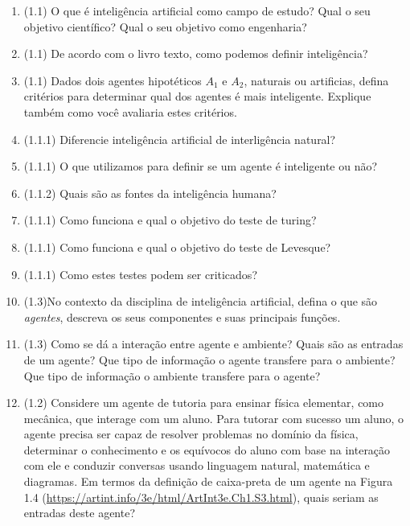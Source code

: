 \documentclass{article}
\begin{document}
\begin{enumerate}
\item (1.1) O que é inteligência artificial como campo de estudo? Qual o seu objetivo científico? Qual o seu objetivo como engenharia?

\item (1.1) De acordo com o livro texto, como podemos definir inteligência?

\item (1.1) Dados dois agentes hipotéticos $A_1$ e $A_2$, naturais ou artificias, defina critérios para determinar qual dos agentes é mais inteligente. Explique também como você avaliaria estes critérios.

\item (1.1.1) Diferencie inteligência artificial de interligência natural?

\item (1.1.1) O que utilizamos para definir se um agente é inteligente ou não?

\item (1.1.2) Quais são as fontes da inteligência humana?

\item (1.1.1) Como funciona e qual o objetivo do teste de turing?

\item (1.1.1) Como funciona e qual o objetivo do teste de Levesque?

\item (1.1.1) Como estes testes podem ser criticados?

\item (1.3)No contexto da disciplina de inteligência artificial, defina o que são \textit{agentes}, descreva os seus componentes e suas principais funções.

\item (1.3)  Como se dá a interação entre agente e ambiente? Quais são as entradas de um agente? Que tipo de informação o agente transfere para o ambiente? Que tipo de informação o ambiente transfere para o agente?

\item (1.2) Considere um agente de tutoria para ensinar física elementar, como mecânica, que interage com um aluno. Para tutorar com sucesso um aluno, o agente precisa ser capaz de resolver problemas no domínio da física, determinar o conhecimento e os equívocos do aluno com base na interação com ele e conduzir conversas usando linguagem natural, matemática e diagramas. Em termos da definição de caixa-preta de um agente na Figura 1.4 (\url{https://artint.info/3e/html/ArtInt3e.Ch1.S3.html}), quais seriam as entradas deste agente?


\end{enumerate}
\end{document}
